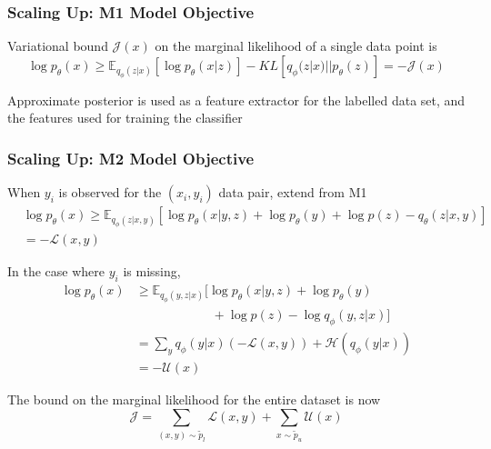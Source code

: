 \documentclass{beamer}
\begin{document}
\begin{frame}
  \frametitle{Scaling Up: M1 Model Objective}

  Variational bound $\mathcal{J}(x)$ on the marginal likelihood of
  a single data point is\footnotemark
  \[
  \log p_\theta (x) \ge \mathbb{E}_{q_\phi (z|x)}
       [\log p_\theta (x|z)] - KL[q_\phi (z|x)||p_\theta (z)]
       = - \mathcal{J}(x)
   \]

   Approximate posterior is used as a feature extractor for the
   labelled data set, and the features used for training the
   classifier

\end{frame}

\begin{frame}
  \frametitle{Scaling Up: M2 Model Objective}

  When $y_i$ is observed for the $(x_i,y_i)$ data pair, extend from M1
  \begin{align*}
    &\log p_\theta (x) \ge \mathbb{E}_{q_\phi (z|x,y)}
       [\log p_\theta (x|y,z) + \log p_\theta (y) + \log p(z) -
         q_\theta (z|x,y)] \\
       &= - \mathcal{L}(x,y)
  \end{align*}

  In the case where $y_i$ is missing,
  \begin{align*}
    \log p_\theta (x) &\ge \mathbb{E}_{q_\phi (y,z|x)}
         [\log p_\theta (x|y,z) + \log p_\theta (y) \\
           &\qquad\qquad\qquad + \log p(z) - \log q_\phi (y,z|x)] \\
         &= \sum_y q_\phi (y|x) ( - \mathcal{L}(x,y))
         + \mathcal{H}(q_\phi (y|x)) \\
         &= - \mathcal{U}(x)
  \end{align*}

  The bound on the marginal likelihood for the entire dataset is
  now\footnotemark
  \[
  \mathcal{J} = \sum_{(x,y) \sim \tilde{p}_l} \mathcal{L}(x,y)
    + \sum_{x \sim \tilde{p}_u} \mathcal{U}(x)
    \]

\end{frame}
\end{document}
